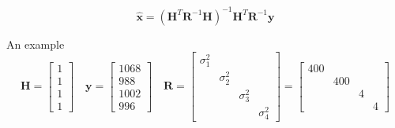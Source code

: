 \documentclass{article}
\begin{document}
\begin{equation}
\hat{\mathbf{x}}=\left(\mathbf{H}^{T} \mathbf{R}^{-1} \mathbf{H}\right)^{-1} \mathbf{H}^{T} \mathbf{R}^{-1} \mathbf{y}
\end{equation}






An example
\begin{equation}
\mathbf{H}=\left[\begin{array}{l}{1} \\ {1} \\ {1} \\ {1}\end{array}\right] \quad \mathbf{y}=\left[\begin{array}{c}{1068} \\ {988} \\ {1002} \\ {996}\end{array}\right] \quad \mathbf{R}=\left[\begin{array}{cccc}{\sigma_{1}^{2}} & {} & {} & {}  \\ {} &  {\sigma_{2}^{2}} & {}  & {} \\  {} & {} &  {\sigma_{3}^{2}} & {} \\ {} & {} & {} & {\sigma_{4}^{2}}\end{array}\right]=
\left[\begin{array}{cccc}{400} & {}  & {}  & {} \\ 
                         {} & {400}  & {}   & {}  \\ 
                         {} & {} & {4} & {}  \\ 
                         {} & {} & {} & {4}
\end{array}\right]
\end{equation}
\end{document}
